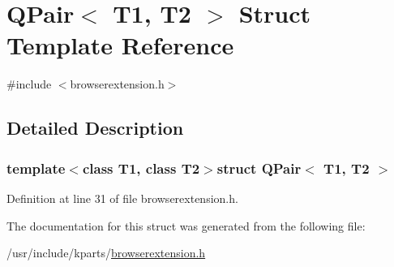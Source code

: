 \hypertarget{structQPair}{\section{Q\+Pair$<$ T1, T2 $>$ Struct Template Reference}
\label{structQPair}
}


{\ttfamily \#include $<$browserextension.\+h$>$}



\subsection{Detailed Description}
\subsubsection*{template$<$class T1, class T2$>$struct Q\+Pair$<$ T1, T2 $>$}



Definition at line 31 of file browserextension.\+h.



The documentation for this struct was generated from the following file\+:\begin{DoxyCompactItemize}
\item 
/usr/include/kparts/\hyperlink{browserextension_8h}{browserextension.\+h}\end{DoxyCompactItemize}
